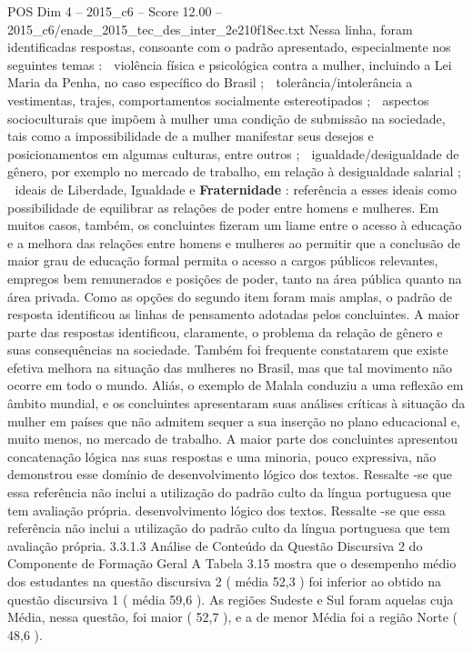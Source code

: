 \begin{textsample}{POS Dim 4 – 2015\_c6 – Score 12.00 – 2015\_c6/enade\_2015\_tec\_des\_inter\_2e210f18ec.txt}
Nessa linha, foram identificadas respostas, consoante com o padrão apresentado, especialmente nos seguintes temas :  violência física e psicológica contra a mulher, incluindo a Lei Maria da Penha, no caso específico do Brasil ;  tolerância/intolerância a vestimentas, trajes, comportamentos socialmente estereotipados ;  aspectos socioculturais que impõem à mulher uma condição de submissão na sociedade, tais como a impossibilidade de a mulher manifestar seus desejos e posicionamentos em algumas culturas, entre outros ;  igualdade/desigualdade de gênero, por exemplo no mercado de trabalho, em relação à desigualdade salarial ;  ideais de Liberdade, Igualdade e \textbf{Fraternidade} : referência a esses ideais como possibilidade de equilibrar as relações de poder entre homens e mulheres.
Em muitos casos, também, os concluintes fizeram um liame entre o acesso à educação e a melhora das relações entre homens e mulheres ao permitir que a conclusão de maior grau de educação formal permita o acesso a cargos públicos relevantes, empregos bem remunerados e posições de poder, tanto na área pública quanto na área privada.
Como as opções do segundo item foram mais amplas, o padrão de resposta identificou as linhas de pensamento adotadas pelos concluintes.
A maior parte das respostas identificou, claramente, o problema da relação de gênero e suas consequências na sociedade.
Também foi frequente constatarem que existe efetiva melhora na situação das mulheres no Brasil, mas que tal movimento não ocorre em todo o mundo.
Aliás, o exemplo de Malala conduziu a uma reflexão em âmbito mundial, e os concluintes apresentaram suas análises críticas à situação da mulher em países que não admitem sequer a sua inserção no plano educacional e, muito menos, no mercado de trabalho.
A maior parte dos concluintes apresentou concatenação lógica nas suas respostas e uma minoria, pouco expressiva, não demonstrou esse domínio de desenvolvimento lógico dos textos.
Ressalte -se que essa referência não inclui a utilização do padrão culto da língua portuguesa que tem avaliação própria. desenvolvimento lógico dos textos.
Ressalte -se que essa referência não inclui a utilização do padrão culto da língua portuguesa que tem avaliação própria. 3.3.1.3 Análise de Conteúdo da Questão Discursiva 2 do Componente de Formação Geral A Tabela 3.15 mostra que o desempenho médio dos estudantes na questão discursiva 2 ( média 52,3 ) foi inferior ao obtido na questão discursiva 1 ( média 59,6 ).
As regiões Sudeste e Sul foram aquelas cuja Média, nessa questão, foi maior ( 52,7 ), e a de menor Média foi a região Norte ( 48,6 ).

\end{textsample}
